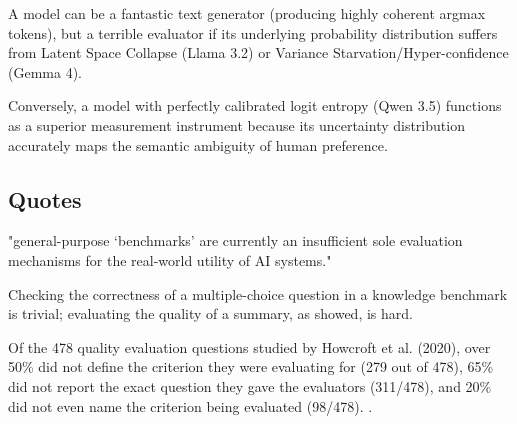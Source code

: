 
A model can be a fantastic text generator (producing highly coherent argmax tokens), but a terrible evaluator if its underlying probability distribution suffers from Latent Space Collapse (Llama 3.2) or Variance Starvation/Hyper-confidence (Gemma 4).

Conversely, a model with perfectly calibrated logit entropy (Qwen 3.5) functions as a superior measurement instrument because its uncertainty distribution accurately maps the semantic ambiguity of human preference.

\subsection{Quotes}

"general-purpose ‘benchmarks’ are currently an insufficient sole evaluation mechanisms for the real-world utility of AI systems." \citep{salaudeenMeasurementMeaningValidityCentered2025}

Checking the correctness of a multiple-choice question in a knowledge benchmark is trivial; evaluating the quality of a summary, as \citet{fabbri_summeval_2021} showed, is hard. 

Of the 478 quality evaluation questions studied by Howcroft et al. (2020), over 50\% did not define the criterion they were evaluating for (279 out of 478), 65\% did not report the exact question they gave the evaluators (311/478), and 20\% did not even name the criterion being evaluated (98/478). \citep{gehrmann2023repairing}. 




